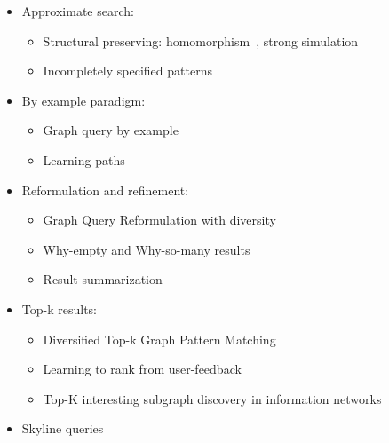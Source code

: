 			\begin{itemize}
				\item Approximate search:
					\begin{itemize}
						\item Structural preserving: homomorphism~\cite{fan2010graph}, strong simulation~\cite{ma2014strong}
						\item Incompletely specified patterns~\cite{yang2014slq,khan2013nema,yuan2012efficient}
					\end{itemize}
				\item By example paradigm:
					\begin{itemize}
						\item Graph query by example~\cite{mottin2014exemplar,jayaram2015querying}	
						\item Learning paths~\cite{bonifati2014learning} 
					\end{itemize}
			\end{itemize}
			\begin{itemize}
				\item Reformulation and refinement:
					\begin{itemize}
						\item Graph Query Reformulation with diversity~\cite{mottin2015graph}
						\item Why-empty and Why-so-many results~\cite{vasilyeva2016answering}
						\item Result summarization~\cite{ranu2014answering,wu2013summarizing}
					\end{itemize}
				\item Top-k results: 
					\begin{itemize}
					 	\item Diversified Top-k Graph Pattern Matching~\cite{fan2013diversified}
					 	\item Learning to rank from user-feedback~\cite{su2015exploiting}
					 	\item Top-K interesting subgraph discovery in information networks~\cite{gupta2014top,jin2015querying}
					 \end{itemize}
				\item Skyline queries~\cite{zheng2014efficient,zou2010dynamic}  
			\end{itemize}
